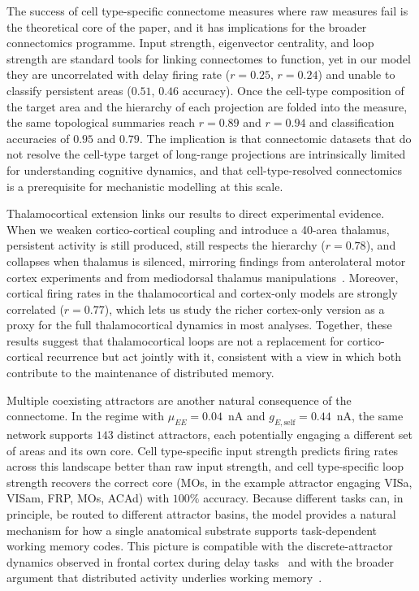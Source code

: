 \documentclass[11pt]{article}
\begin{document}
The success of cell type-specific connectome measures where raw measures fail is the theoretical core of the paper, and it has implications for the broader connectomics programme. Input strength, eigenvector centrality, and loop strength are standard tools for linking connectomes to function, yet in our model they are uncorrelated with delay firing rate ($r=0.25$, $r=0.24$) and unable to classify persistent areas ($0.51$, $0.46$ accuracy). Once the cell-type composition of the target area and the hierarchy of each projection are folded into the measure, the same topological summaries reach $r=0.89$ and $r=0.94$ and classification accuracies of $0.95$ and $0.79$. The implication is that connectomic datasets that do not resolve the cell-type target of long-range projections are intrinsically limited for understanding cognitive dynamics, and that cell-type-resolved connectomics~\cite{kim2017braintype,harris2019hierarchical,fulcher2019overlapping} is a prerequisite for mechanistic modelling at this scale.

Thalamocortical extension links our results to direct experimental evidence. When we weaken cortico-cortical coupling and introduce a 40-area thalamus, persistent activity is still produced, still respects the hierarchy ($r=0.78$), and collapses when thalamus is silenced, mirroring findings from anterolateral motor cortex experiments and from mediodorsal thalamus manipulations~\cite{guo2017maintenance,bolkan2017thalamic,schmitt2017thalamic}. Moreover, cortical firing rates in the thalamocortical and cortex-only models are strongly correlated ($r=0.77$), which lets us study the richer cortex-only version as a proxy for the full thalamocortical dynamics in most analyses. Together, these results suggest that thalamocortical loops are not a replacement for cortico-cortical recurrence but act jointly with it, consistent with a view in which both contribute to the maintenance of distributed memory.

Multiple coexisting attractors are another natural consequence of the connectome. In the regime with $\mu_{EE}=0.04$~nA and $g_{E,\text{self}}=0.44$~nA, the same network supports $143$ distinct attractors, each potentially engaging a different set of areas and its own core. Cell type-specific input strength predicts firing rates across this landscape better than raw input strength, and cell type-specific loop strength recovers the correct core (MOs, in the example attractor engaging VISa, VISam, FRP, MOs, ACAd) with $100\%$ accuracy. Because different tasks can, in principle, be routed to different attractor basins, the model provides a natural mechanism for how a single anatomical substrate supports task-dependent working memory codes. This picture is compatible with the discrete-attractor dynamics observed in frontal cortex during delay tasks~\cite{inagaki2019discrete} and with the broader argument that distributed activity underlies working memory~\cite{christophel2017distributed,leavitt2017sustained}.
\end{document}
